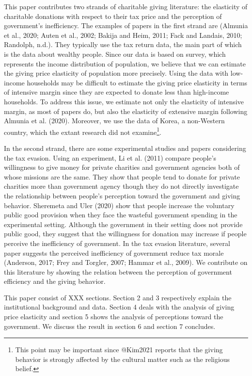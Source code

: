 \documentclass[ review  , 3p ]{elsarticle}
\begin{document}
  This paper contributes two strands of charitable giving literature: the elasticity of charitable donations with respect to their tax price and the perception of government's inefficiency. The examples of papers in the first strand are (Almunia et al., 2020; Auten et al., 2002; Bakija and Heim, 2011; Fack and Landais, 2010; Randolph, n.d.). They typically use the tax return data, the main part of which is the data about wealthy people. Since our data is based on survey, which represents the income distribution of population, we believe that we can estimate the giving price elasticity of population more precisely. Using the data with low-income households may be difficult to estimate the giving price elasticity in terms of intensive margin since they are expected to donate less than high-income households. To address this issue, we estimate not only the elasticity of intensive margin, as most of papers do, but also the elasticity of extensive margin following Almunia et al. (2020).
  Moreover, we use the data of Korea, a non-Western country, which the extant research did not examine\footnote{This point may be important since @Kim2021 reports that the giving behavior is strongly affected by the cultural matter such as the religious belief.}.
  
  In the second strand, there are some experimental studies and papers considering the tax evasion. Using an experiment, Li et al. (2011) compare people's willingness to give money for private charities and government agencies both of whose missions are the same. They show that people tend to donate for private charities more than government agency though they do not directly investigate the relationship between people's perception toward the government and giving behavior. Sheremeta and Uler (2020) show that people increase the voluntary public good provision when they face the wasteful government spending in the experimental setting. Although the government in their setting does not provide public good, they suggest that the willingness for donation may increase if people perceive the inefficiency of government. In the tax evasion literature, several paper suggests the perceived inefficiency of government reduce tax morale (Anderson, 2017; Frey and Torgler, 2007; Hammar et al., 2009). We contribute on this literature by showing the relation between the perception of government efficiency and the giving behavior.
  
  This paper consist of XXX sections. Section 2 and 3 respectively explain the institutional background and data. Section 4 deals with the analysis of giving price elasticity and section 5 shows the analysis of perceptions toward the government. We discuss the result in section 6 and section 7 concludes.
  
\end{document}
